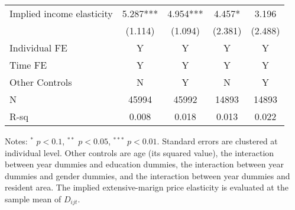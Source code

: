 \documentclass[ review  , 3p ]{elsarticle}
\begin{document}
\begin{table}
\begin{threeparttable}
\begin{tabular}[t]{lcccc}
  \hspace{1em}Implied income elasticity & 5.287*** & 4.954*** & 4.457* & 3.196\\
  \hspace{1em} & (1.114) & (1.094) & (2.381) & (2.488)\\
  \hspace{1em}Individual FE & Y & Y & Y & Y\\
  \hspace{1em}Time FE & Y & Y & Y & Y\\
  \hspace{1em}Other Controls & N & Y & N & Y\\
  \hspace{1em}N & 45994 & 45992 & 14893 & 14893\\
  \hspace{1em}R-sq & 0.008 & 0.018 & 0.013 & 0.022\\
  \bottomrule
  \end{tabular}
  \begin{tablenotes}
  \item Notes: $^{*}$ $p < 0.1$, $^{**}$ $p < 0.05$, $^{***}$ $p < 0.01$. Standard errors are clustered at individual level. Other controls are age (its squared value), the interaction between year dummies and education dummies, the interaction between year dummies and gender dummies, and the interaction between year dummies and resident area. The implied extensive-marign price elasticity is evaluated at the sample mean of $D_{ijt}$.
  \end{tablenotes}
  \end{threeparttable}
  \end{table}
  
\end{document}
